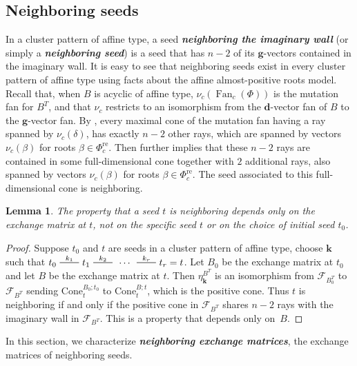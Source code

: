 \documentclass[10pt]{article}
\newtheorem{lemma}[proposition]{Lemma}
\theoremstyle{definition}
\theoremstyle{remark}
\numberwithin{equation}{section}
\newcommand{\newword}[1]{\textbf{\emph{#1}}}
\newcommand{\edge}{\,\,\rule[2.7pt]{20pt}{0.5pt}\,\,}
\newcommand{\F}{{\mathcal F}}
\newcommand{\0}{{\mathbf{0}}}
\newcommand{\Cone}{\mathrm{Cone}}
\newcommand{\g}{\mathbf{g}}
\newcommand{\kk}{{\boldsymbol{k}}}
\newcommand{\Fan}{\operatorname{Fan}}
\newcommand{\re}{\mathrm{re}}
\newcommand{\dd}{{\mathbf d}}
\newcommand{\RSChar}{\Phi}
\newcommand{\RS}{\RSChar}
\newcommand{\AP}[1]{\RS_{#1}}
\newcommand{\APre}[1]{\AP{#1}^\re}
\begin{document}
\subsection{Neighboring seeds}\label{neigh sec}
In a cluster pattern of affine type, a seed \newword{neighboring the imaginary wall} (or simply a \newword{neighboring seed}) is a seed that has $n-2$ of its $\g$-vectors contained in the imaginary wall.
It is easy to see that neighboring seeds exist in every cluster pattern of affine type using facts about the affine almost-positive roots model.
Recall that, when $B$ is acyclic of affine type, $\nu_c(\Fan_c(\RS))$ is the mutation fan for $B^T$, and that $\nu_c$ restricts to an isomorphism from the $\dd$-vector fan of $B$ to the $\g$-vector fan.
By \cite[Proposition~5.14]{affdenom}, every maximal cone of the mutation fan having a ray spanned by $\nu_c(\delta)$, has exactly $n-2$ other rays, which are spanned by vectors $\nu_c(\beta)$ for roots $\beta\in\APre{c}$.
Then \cite[Proposition~5.14]{affdenom} further implies that these $n-2$ rays are contained in some full-dimensional cone together with $2$ additional rays, also spanned by vectors $\nu_c(\beta)$ for roots $\beta\in\APre{c}$.
The seed associated to this full-dimensional cone is neighboring.

\begin{lemma}\label{neigh B only}
The property that a seed $t$ is neighboring depends only on the exchange matrix at $t$, not on the specific seed $t$ or on the choice of initial seed $t_0$.
\end{lemma}
\begin{proof}
Suppose $t_0$ and $t$ are seeds in a cluster pattern of affine type, choose $\kk$ such that $t_0\overset{k_1}{\edge}t_1\overset{k_2}{\edge}\,\cdots\,\overset{k_r}{\edge}t_r=t$.
Let $B_0$ be the exchange matrix at $t_0$ and let $B$ be the exchange matrix at $t$.
Then $\eta^{B^T}_\kk$ is an isomorphism from $\F_{B_0^T}$ to $\F_{B^T}$ sending $\Cone_t^{B_0;t_0}$ to $\Cone_t^{B;t}$, which is the positive cone.
Thus $t$ is neighboring if and only if the positive cone in $\F_{B^T}$ shares $n-2$ rays with the imaginary wall in $\F_{B^T}$.
This is a property that depends only on~$B$.
\end{proof}

In this section, we characterize \newword{neighboring exchange matrices}, the exchange matrices of neighboring seeds.
\end{document}
